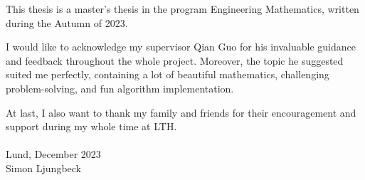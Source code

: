 This thesis is a master's thesis in the program Engineering Mathematics, written during the Autumn of 2023.

I would like to acknowledge my supervisor Qian Guo for his invaluable guidance and feedback throughout the whole project. Moreover, the topic he suggested suited me perfectly, containing a lot of beautiful mathematics, challenging problem-solving, and fun algorithm implementation.

At last, I also want to thank my family and friends for their encouragement and support during my whole time at LTH.
\\
\\
\noindent
Lund, December 2023
\\
\noindent
Simon Ljungbeck